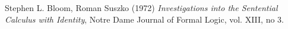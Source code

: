 \documentclass{article}
\theoremstyle{definition}
\begin{document}

\begin{thebibliography}{9}
    Stephen L. Bloom, Roman Suszko (1972) \emph{Investigations into the Sentential Calculus with Identity}, Notre Dame Journal of Formal Logic, vol. XIII, no 3.



\end{thebibliography}
\end{document}
